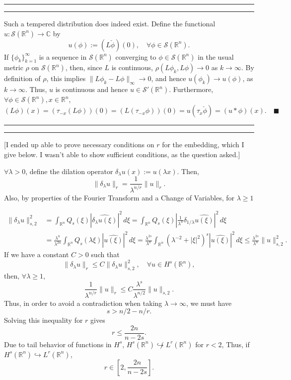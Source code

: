 \documentclass[11pt]{article}
\newcounter{questionCounter}
\newcounter{partCounter}[questionCounter]
\newenvironment{question}[2][\arabic{questionCounter}]{%
    \setcounter{partCounter}{0}%
    \vspace{.25in} \hrule \vspace{0.5em}%
        \noindent{\bf #2}%
    \vspace{0.8em} \hrule \vspace{.10in}%
    \addtocounter{questionCounter}{1}%
}{}
\renewcommand{\qed}{\quad \ensuremath{\blacksquare}}
\newcommand{\R}{\mathbb{R}}             %
\newcommand{\C}{\mathbb{C}}             %
\renewcommand{\S}{\mathcal{S}}          %
\begin{document}
\begin{question}{Problem 4}
Such a tempered distribution does indeed exist.
Define the functional $u : \S(\R^n) \to \C$ by
\[u (\phi) := (L \check \phi)(0), \quad \forall \phi \in \S(\R^n).\]
If $\{\phi_k\}_{k = 1}^\infty$ is a sequence in $\S(\R^n)$ converging to
$\phi \in \S(\R^n)$ in the usual metric $\rho$ on $\S(\R^n)$, then, since
$L$ is continuous, $\rho(L\phi_k,L\phi) \to 0$ as $k \to \infty$. By definition
of $\rho$, this implies $\|L\phi_k - L\phi\|_\infty \to 0$, and hence
$u(\phi_k) \to u(\phi)$, as $k \to \infty$. Thus, $u$ is continuous and hence
$u \in \S'(\R^n)$. Furthermore, $\forall \phi \in \S(\R^n), x \in \R^n$,
\[
(L \phi)(x)
    = (\tau_{-x} (L \phi))(0)
    = (L ({\tau_{-x} \phi}))(0)
    = u(\tau_{x} \check \phi)
    = (u * \phi)(x). \qed
\]
\end{question}

\newpage
\begin{question}{Problem 5}
[I ended up able to prove necessary conditions on $r$ for the embedding, which
I give below. I wasn't able to show sufficient conditions, as the question asked.]

$\forall \lambda > 0$, define the dilation operator
$\delta_\lambda u(x) := u(\lambda x)$. Then,
\[\|\delta_\lambda u\|_r = \frac{1}{\lambda^{n/r}} \|u\|_r.\]
Also, by properties of the Fourier Transform and a Change of Variables, for
$\lambda \geq 1$

\begin{align*}
\|\delta_\lambda u\|_{s,2}^2
 &  = \int_{\R^n} Q_s(\xi) |\widehat{\delta_\lambda u(\xi)}|^2\, d\xi
    = \int_{\R^n} Q_s(\xi) \left|
                        \frac{1}{\lambda^n} \delta_{1/\lambda}
                                        \widehat{u(\xi)} \right|^2\, d\xi   \\
 &  = \frac{\lambda^n}{\lambda^{2n}}
                \int_{\R^n} Q_s(\lambda \xi) \left|
                                            \widehat{u(\xi)} \right|^2\, d\xi
    = \frac{\lambda^{2s}}{\lambda^{n}}
                \int_{\R^n} (\lambda^{-2} + |\xi|^2)^s \left|
                                            \widehat{u(\xi)} \right|^2\, d\xi
    \leq \frac{\lambda^{2s}}{\lambda^{n}} \|u\|_{s,2}^2.
\end{align*}
If we have a constant $C > 0$ such that
\[\|\delta_\lambda u\|_r \leq C \|\delta_\lambda u\|_{s,2}^2, \quad \forall u \in H^s(\R^n),\]
then, $\forall \lambda \geq 1$,
\[\frac{1}{\lambda^{n/r}}\|u\|_r \leq C
    \frac{\lambda^s}{\lambda^{n/2}}\|u\|_{s,2}.\]
Thus, in order to avoid a contradiction when taking $\lambda \to \infty$, we
must have
\[s > n/2 - n/r.\]
Solving this inequality for $r$ gives
\[r \leq \frac{2n}{n - 2s}.\]
Due to tail behavior of functions in $H^s$,
$H^s(\R^n) \not \hookrightarrow L^r(\R^n)$ for $r < 2$,
Thus, if $H^s(\R^n) \hookrightarrow L^r(\R^n)$,
\[r \in \left[ 2, \frac{2n}{n - 2s}\right].\]
\end{question}
\end{document}
